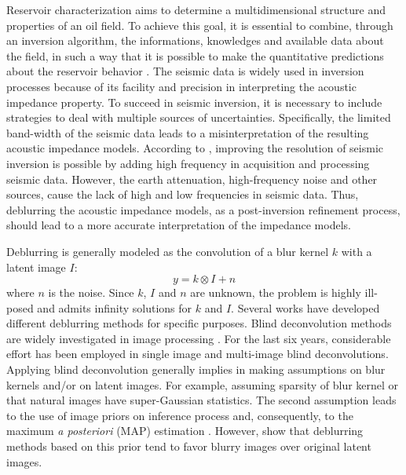 \documentclass[conference,compsoc]{IEEEtran}
\begin{document}
Reservoir characterization aims to determine a multidimensional
structure and properties of an oil field. To achieve this goal, it is essential to combine, through an
inversion algorithm, the informations, knowledges and available data about the field,
in such a way that it is possible to make the
quantitative predictions about the reservoir behavior \cite{buiting}.
The seismic data is widely used in inversion processes because of its facility and precision
in interpreting the acoustic impedance property.
To succeed in seismic inversion, it is necessary to include strategies to deal with multiple
sources of uncertainties. Specifically, the limited band-width of the seismic data leads to
a misinterpretation of the resulting acoustic impedance models.
According to \cite{xiaoiu}, improving the resolution of seismic inversion is
possible by adding high frequency in acquisition and processing seismic data.
However, the earth attenuation, high-frequency noise and other sources, cause
the lack of high and low frequencies in seismic data. 
Thus, deblurring the acoustic impedance models, as a post-inversion refinement process, should lead to a more accurate
interpretation of the impedance models.

Deblurring is generally modeled as the convolution of a blur kernel $k$
with a latent image $I$: 
\begin{equation}
 y = k \otimes I + n
 \label{eq:deblurr}
\end{equation}
where $n$ is the noise. Since $k$, $I$ and $n$ are unknown, the problem 
is highly ill-posed and admits infinity solutions for $k$ and $I$.
Several works have developed different deblurring methods for specific purposes.
Blind deconvolution methods are widely investigated in image processing \cite{bishop}.
For the last six years, considerable effort has been employed in single image
\cite{babacan,Krishnan2015,Levin2011,Zhang2011} and multi-image \cite{sroubek2012,Zhu2012} blind deconvolutions. 
Applying blind deconvolution generally implies in making assumptions on
blur kernels and/or on latent images. For example, assuming sparsity of blur kernel
or that natural images have super-Gaussian statistics. The second assumption
leads to the use of image priors on inference process and, consequently, to the maximum \textit{a posteriori}
(MAP) estimation \cite{babacan}. However, \cite{Levin} show that deblurring methods
based on this prior tend to favor blurry images over original latent images.
\end{document}
